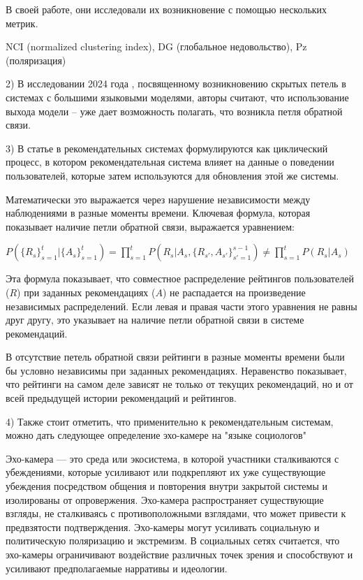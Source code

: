 \documentclass{article}
\begin{document}
В своей работе, они исследовали их возникновение с помощью нескольких метрик. 

NCI (normalized clustering index), DG (глобальное недовольство), Pz (поляризация)

2) В исследовании 2024 года \cite{mehrabi2024flirt}, посвященному возникновению скрытых петель в системах с большими языковыми моделями, авторы считают, что использование выхода модели – уже дает возможность полагать, что возникла петля обратной связи. 

3) В статье \cite{breaking_feedbackloops2022} в рекомендательных системах формулируются как циклический процесс, в котором рекомендательная система влияет на данные о поведении пользователей, которые затем используются для обновления этой же системы.

Математически это выражается через нарушение независимости между наблюдениями в разные моменты времени. Ключевая формула, которая показывает наличие петли обратной связи, выражается уравнением:

$P(\{ R_s \}_{s=1}^t | \{ A_s\}_{s=1}^t) = \prod\limits_{s=1}^t P(R_s | A_s, \{R_{s'}, A_{s'} \}_{s'=1}^{s-1}) \neq \prod\limits_{s=1}^t P(R_s | A_s)$

Эта формула показывает, что совместное распределение рейтингов пользователей ($R$) при заданных рекомендациях ($A$) не распадается на произведение независимых распределений. Если левая и правая части этого уравнения не равны друг другу, это указывает на наличие петли обратной связи в системе рекомендаций.

В отсутствие петель обратной связи рейтинги в разные моменты времени были бы условно независимы при заданных рекомендациях. Неравенство показывает, что рейтинги на самом деле зависят не только от текущих рекомендаций, но и от всей предыдущей истории рекомендаций и рейтингов.

4) Также стоит отметить, что применительно к рекомендательным системам, можно дать следующее определение эхо-камере на "языке социологов"

Эхо-камера — это среда или экосистема, в которой участники сталкиваются с убеждениями, которые усиливают или подкрепляют их уже существующие убеждения посредством общения и повторения внутри закрытой системы и изолированы от опровержения. Эхо-камера распространяет существующие взгляды, не сталкиваясь с противоположными взглядами, что может привести к предвзятости подтверждения. Эхо-камеры могут усиливать социальную и политическую поляризацию и экстремизм. В социальных сетях считается, что эхо-камеры ограничивают воздействие различных точек зрения и способствуют и усиливают предполагаемые нарративы и идеологии.
\end{document}
